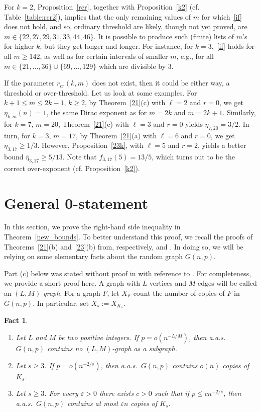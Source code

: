 \documentclass[reqno, 12pt]{amsart}
\numberwithin{equation}{section}
\numberwithin{figure}{section}
\let\epsilon=\varepsilon
\let\eps=\epsilon
\theoremstyle{plain}
\newtheorem{fact}[thm]{Fact}
\theoremstyle{definition}
\begin{document}
For $k=2$, Proposition~\ref{rcr}, together with Proposition~\ref{k2} (cf. Table~\ref{table:rcr2}), implies that the only remaining values of $m$ for which~\eqref{if} does not hold, and so, ordinary threshold are likely,  though not yet proved, are $m\in\{22,27,29,31,33,44,46\}.$
It is possible to produce such (finite) lists of $m$'s for higher $k$, but they get longer and longer. For instance, for $k=3$,~\eqref{if} holds for all $m\ge 142$, as well as for certain intervals of smaller $m$, e.g., for all $m\in\{21,\dots,36\}\cup\{69,\dots,129\}$  which are divisible by 3.


	

\medskip

If the parameter $r_{cr}(k,m)$ does not exist, then it could be either way, a threshold or over-threshold.
Let us look at some examples.
	For $k+1\le m\le2k-1$, $k\ge2$,  by Theorem~\ref{21}(c) with $\ell=2$ and $r=0$, we get $\eta_{k,m}(n)=1$, the same Dirac exponent as for $m=2k$ and $m=2k+1$. Similarly, for $k=7$, $m=20$,  Theorem~\ref{21}(c) with $\ell=3$ and $r=0$ yields $\eta_{7,20}=3/2$.
	In turn, for $k=3$, $m=17$,  by Theorem~\ref{21}(a) with $\ell=6$ and $r=0$, we get $\eta_{3,17}\ge 1/3$. However, Proposition~\ref{23k}, with $\ell=5$ and $r=2$, yields a better bound $\bar\eta_{3,17}\ge 5/13$. Note that $f_{3,17}(5)=13/5$, which turns out to be the correct over-exponent (cf. Proposition~\ref{k2}).


	
\section{General 0-statement}\label{lb}

In this section, we prove the right-hand side inequality in Theorem~\ref{new_bounds}. To better understand this proof, we recall the proofs of Theorems~\ref{21}(b) and~\ref{23}(b) from, respectively, \cite{ADRRS} and \cite{ADR}. In doing so, we will be relying on some elementary facts about the random graph $G(n,p)$.

 Part (c) below was stated without proof in \cite[Fact 2.1]{ADRRS} with reference to \cite[Remark 3.7]{JLR}. For completeness, we provide a short proof here. A graph with $L$ vertices and $M$ edges will be called an \emph{$(L,M)$-graph}. For a graph $F$, let $X_F$ count the number of copies of $F$ in $G(n,p)$. In particular, set $X_s:=X_{K_s}$.

\begin{fact}\label{Markov}~
\begin{enumerate}
\item[(a)] Let $L$ and $M$ be two positive integers. If $p=o(n^{-L/M})$, then a.a.s.~$G(n,p)$ contains no $(L,M)$-graph as a subgraph.
\item[(b)] Let $s\ge3$. If $p=o(n^{-2/s})$, then a.a.s.~$G(n,p)$ contains $o(n)$ copies of $K_s$.
\item[(c)] Let $s\ge3$. For every $\eps>0$ there exists $c>0$ such that if $p\le cn^{-2/s}$, then a.a.s.~$G(n,p)$ contains at most $\eps n$ copies of $K_s$.
\end{enumerate}
\end{fact}
\end{document}
